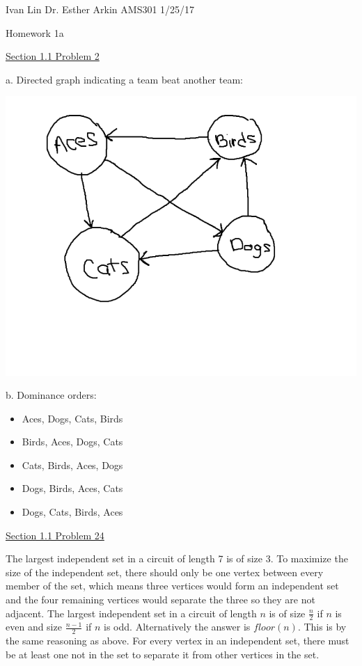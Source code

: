 \documentclass{article}
\begin{document}
Ivan Lin\newline{}
Dr. Esther Arkin\newline{}
AMS301\newline{}
1/25/17

\begin{center}
  Homework 1a
\end{center}

\underline{Section 1.1 Problem 2}

a. Directed graph indicating a team beat another team:

\includegraphics[width=\textwidth]{2a.png}\newline{}

b. Dominance orders:
\begin{itemize}
\item Aces, Dogs, Cats, Birds
\item Birds, Aces, Dogs, Cats
\item Cats, Birds, Aces, Dogs
\item Dogs, Birds, Aces, Cats
\item Dogs, Cats, Birds, Aces\newline{}
\end{itemize}


\underline{Section 1.1 Problem 24}

The largest independent set in a circuit of length 7 is of size 3.\newline{}
To maximize the size of the independent set, there should only be one vertex between every member of the set, which means three vertices would form an independent set and the four remaining vertices would separate the three so they are not adjacent.\newline{}
The largest independent set in a circuit of length $n$ is of size $\frac{n}{2}$ if $n$ is even and size $\frac{n-1}{2}$ if $n$ is odd. Alternatively the answer is $floor(n)$.\newline{}
This is by the same reasoning as above. For every vertex in an independent set, there must be at least one not in the set to separate it from other vertices in the set.\newline{}
\end{document}
